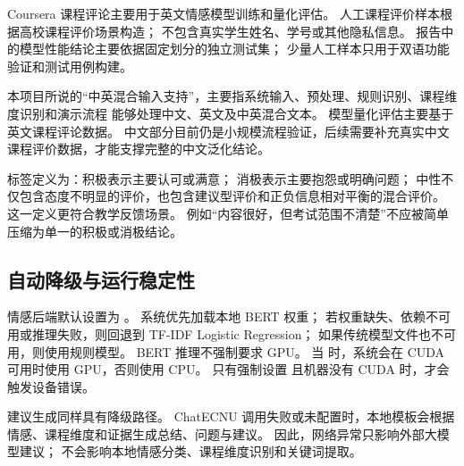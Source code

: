 Coursera 课程评论主要用于英文情感模型训练和量化评估。
人工课程评价样本根据高校课程评价场景构造；
不包含真实学生姓名、学号或其他隐私信息。
报告中的模型性能结论主要依据固定划分的独立测试集；
少量人工样本只用于双语功能验证和测试用例构建。

本项目所说的“中英混合输入支持”，主要指系统输入、预处理、规则识别、课程维度识别和演示流程
能够处理中文、英文及中英混合文本。
模型量化评估主要基于英文课程评论数据。
中文部分目前仍是小规模流程验证，后续需要补充真实中文课程评价数据，才能支撑完整的中文泛化结论。

标签定义为：积极表示主要认可或满意；
消极表示主要抱怨或明确问题；
中性不仅包含态度不明显的评价，也包含建议型评价和正负信息相对平衡的混合评价。
这一定义更符合教学反馈场景。
例如“内容很好，但考试范围不清楚”不应被简单压缩为单一的积极或消极结论。

\subsection{自动降级与运行稳定性}

情感后端默认设置为 。
系统优先加载本地 BERT 权重；
若权重缺失、依赖不可用或推理失败，则回退到 TF-IDF Logistic Regression；
如果传统模型文件也不可用，则使用规则模型。
BERT 推理不强制要求 GPU。
当  时，系统会在 CUDA 可用时使用 GPU，否则使用 CPU。
只有强制设置  且机器没有 CUDA 时，才会触发设备错误。

建议生成同样具有降级路径。
ChatECNU 调用失败或未配置时，本地模板会根据情感、课程维度和证据生成总结、问题与建议。
因此，网络异常只影响外部大模型建议；
不会影响本地情感分类、课程维度识别和关键词提取。